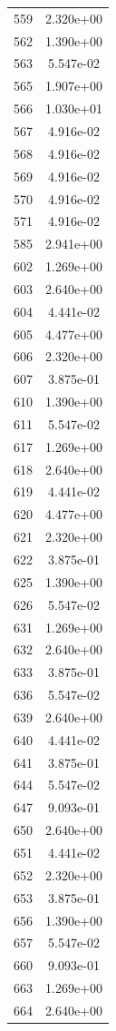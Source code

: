 \documentclass[12pt]{article}
\begin{document}
\begin{longtable}{@{}cc@{}}
559 & 2.320e+00 \\
562 & 1.390e+00 \\
563 & 5.547e-02 \\
565 & 1.907e+00 \\
566 & 1.030e+01 \\
567 & 4.916e-02 \\
568 & 4.916e-02 \\
569 & 4.916e-02 \\
570 & 4.916e-02 \\
571 & 4.916e-02 \\
585 & 2.941e+00 \\
602 & 1.269e+00 \\
603 & 2.640e+00 \\
604 & 4.441e-02 \\
605 & 4.477e+00 \\
606 & 2.320e+00 \\
607 & 3.875e-01 \\
610 & 1.390e+00 \\
611 & 5.547e-02 \\
617 & 1.269e+00 \\
618 & 2.640e+00 \\
619 & 4.441e-02 \\
620 & 4.477e+00 \\
621 & 2.320e+00 \\
622 & 3.875e-01 \\
625 & 1.390e+00 \\
626 & 5.547e-02 \\
631 & 1.269e+00 \\
632 & 2.640e+00 \\
633 & 3.875e-01 \\
636 & 5.547e-02 \\
639 & 2.640e+00 \\
640 & 4.441e-02 \\
641 & 3.875e-01 \\
644 & 5.547e-02 \\
647 & 9.093e-01 \\
650 & 2.640e+00 \\
651 & 4.441e-02 \\
652 & 2.320e+00 \\
653 & 3.875e-01 \\
656 & 1.390e+00 \\
657 & 5.547e-02 \\
660 & 9.093e-01 \\
663 & 1.269e+00 \\
664 & 2.640e+00 \\

\end{longtable}
\end{document}
